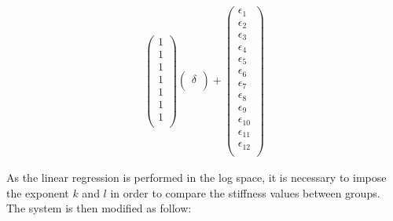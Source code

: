 \documentclass[a4paper,fleqn]{DC_ArtStyle}
\begin{document}
\begin{equation}
\begin{split}
\begin{pmatrix}
	1 \\
	1 \\
	1 \\
	1 \\
	1 \\
	1 \\
	1 \\
	\end{pmatrix}\begin{pmatrix}
	\delta \\
	\end{pmatrix} + \begin{pmatrix}
	\epsilon_{1} \\
	\epsilon_{2} \\
	\epsilon_{3} \\
	\epsilon_{4} \\
	\epsilon_{5} \\
	\epsilon_{6} \\
	\epsilon_{7} \\
	\epsilon_{8} \\
	\epsilon_{9} \\
	\epsilon_{10} \\
	\epsilon_{11} \\
	\epsilon_{12} \\
	\end{pmatrix}
	\end{split}
	\end{equation}
	
	As the linear regression is performed in the log space, it is necessary to impose the exponent $k$ and $l$ in order to compare the stiffness values between groups. The system is then modified as follow:
	
\end{document}
